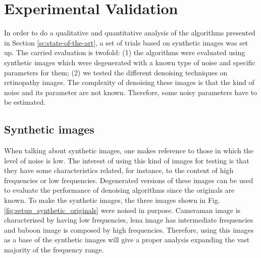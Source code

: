 \section{Experimental Validation} \label{sc:experimental-validation}
In order to do a qualitative and quantitative analysis of the algorithms presented in Section \ref{sc:state-of-the-art}, a set of trials based on synthetic images was set up. The carried evaluation is twofold: (1) the algorithms were evaluated using synthetic images which were degenerated with a known type of noise and specific parameters for them; (2) we tested the different denoising techniques on retinopathy images. The complexity of denoising these images is that the kind of noise and its parameter are not known. Therefore, some noisy parameters have to be estimated.

\subsection{Synthetic images} \label{sc:experimental_sythetic}
When talking about synthetic images, one makes reference to those in which the level of noise is low.  The interest of using this kind of images for testing is that they have some characteristics related, for instance, to the content of high frequencies or low frequencies. Degenerated versions of these images can be used to evaluate the performance of denoising algorithms since the originals are known. To make the synthetic images, the three images shown in Fig. \ref{fig:setup_synthetic_originals} were noised in purpose. Cameraman image is characterised by having low frequencies, lena image has intermediate frequencies and baboon image is composed by high frequencies. Therefore, using this images as a base of the synthetic images will give a proper analysis expanding the vast majority of the frequency range.


